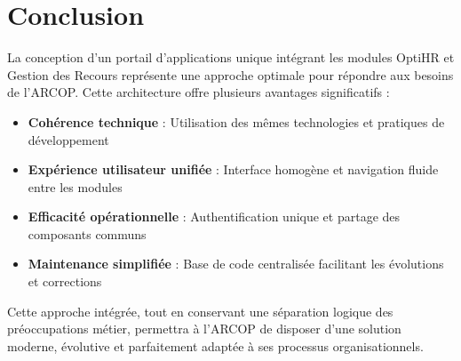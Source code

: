 \section{Conclusion}
La conception d'un portail d'applications unique intégrant les modules OptiHR et Gestion des Recours représente une approche optimale pour répondre aux besoins de l'ARCOP. Cette architecture offre plusieurs avantages significatifs :

\begin{itemize}
    \item \textbf{Cohérence technique} : Utilisation des mêmes technologies et pratiques de développement
    \item \textbf{Expérience utilisateur unifiée} : Interface homogène et navigation fluide entre les modules
    \item \textbf{Efficacité opérationnelle} : Authentification unique et partage des composants communs
    \item \textbf{Maintenance simplifiée} : Base de code centralisée facilitant les évolutions et corrections
\end{itemize}

Cette approche intégrée, tout en conservant une séparation logique des préoccupations métier, permettra à l'ARCOP de disposer d'une solution moderne, évolutive et parfaitement adaptée à ses processus organisationnels.

\clearpage